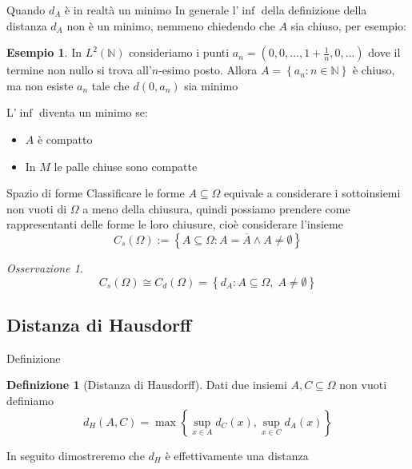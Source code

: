 \documentclass{beamer}
\newcounter{counter1}
\theoremstyle{plain}
\theoremstyle{definition}
\newtheorem{mydef}[counter1]{Definizione}
\newtheorem{myes}[counter1]{Esempio}
\theoremstyle{remark}
\newtheorem{myoss}[counter1]{Osservazione}
\newcommand{\obar}[1]{\overline{#1}}
\newcommand{\set}[1]{\left\{#1\right\}}
\begin{document}
\begin{frame}{Quando $d_A$ \`e in realt\`a un minimo}
  In generale l'$\inf$ della definizione della distanza $d_A$ non \`e
  un minimo, nemmeno chiedendo che $A$ sia chiuso, per esempio:
  \begin{myes}
    In $L^2(\mathbb{N})$ consideriamo i punti $a_n = ( 0, 0, ..., 1 +
    \frac{1}{n} , 0, ...)$ dove il termine non nullo si trova
    all'$n$-esimo posto. Allora $A = \set{ a_n : n\in \mathbb{N}}$ \`e
    chiuso, ma non esiste $a_n$ tale che $d(0,a_n)$ sia minimo
  \end{myes}

  L'$\inf$ diventa un minimo se:
  \begin{itemize}
  \item $A$ \`e compatto
  \item In $M$ le palle chiuse sono compatte
  \end{itemize}
\end{frame}

\begin{frame}{Spazio di forme}
  Classificare le forme $A \subseteq \Omega$ equivale a considerare i
  sottoinsiemi non vuoti di $\Omega$ a meno della chiusura, quindi
  possiamo prendere come rappresentanti delle forme le loro chiusure,
  cioè considerare l'insieme
  \[ C_s(\Omega) := \set{ A \subseteq \Omega : A = \obar A \wedge A
    \neq \emptyset } \]

  \begin{myoss}
    \[ C_s(\Omega) \cong C_d(\Omega) = \set{d_A : A \subseteq \Omega,\;
      A \neq \emptyset} \]
  \end{myoss}
\end{frame}

\subsection{Distanza di Hausdorff}

\begin{frame}{Definizione}
  \begin{mydef}[Distanza di Hausdorff]
    Dati due insiemi $A,C \subseteq \Omega$ non vuoti definiamo
    \[ d_H(A,C) = \max \set{\sup _{x\in A} d_C (x) , \sup _{x\in C}
      d_A (x) } \]
\end{mydef}

In seguito dimostreremo che $d_H$ è effettivamente una distanza
\end{frame}
\end{document}
